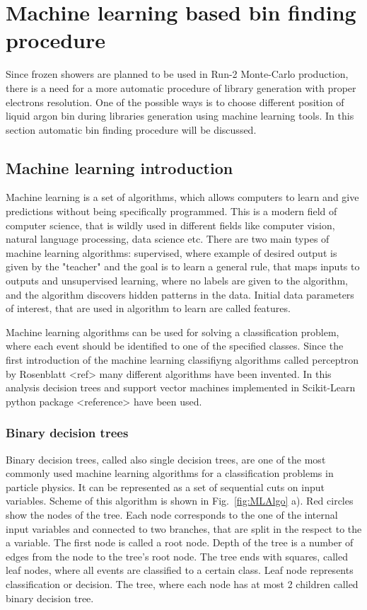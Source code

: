 \section{Machine learning based bin finding procedure}

Since frozen showers are planned to be used in Run-2 Monte-Carlo production, there is a need for a more automatic procedure of library generation with proper electrons resolution. One of the possible ways is to choose different position of liquid argon bin during libraries generation using machine learning tools. In this section automatic bin finding procedure will be discussed.
\subsection{Machine learning introduction} 

Machine learning is a set of algorithms, which allows computers to learn and give predictions without being specifically programmed. This is a modern field of computer science, that is wildly used in different fields like computer vision, natural language processing, data science etc. There are two main types of machine learning algorithms: supervised, where example of desired output is given by the "teacher" and the goal is to learn a general rule, that maps inputs to outputs and unsupervised learning, where no labels are given to the algorithm, and the algorithm discovers hidden patterns in the data. Initial data parameters of interest, that are used in algorithm to learn are called features. 

Machine learning algorithms can be used for solving a classification problem, where each event should be identified to one of the specified classes. Since the first introduction of the machine learning classifiyng algorithms called perceptron by Rosenblatt <ref> many different algorithms have been invented. In this analysis decision trees and support vector machines implemented in Scikit-Learn python package <reference> have been used. 

\subsubsection{Binary decision trees}

Binary decision trees, called also single decision trees, are one of the most commonly used machine learning algorithms for a classification problems in particle physics. It can be represented as a set of sequential cuts on input variables. 
Scheme of this algorithm is shown in Fig.~\ref{fig:MLAlgo} a). Red circles show the nodes of the tree. Each node corresponds to the one of the internal input variables and connected to two branches, that are split in the respect to the a variable. The first node is called a root node. Depth of the tree is a number of edges from the node to the tree's root node. The tree ends with squares, called leaf nodes, where all events are classified to a certain class. Leaf node represents classification or decision. The tree, where each node has at most 2 children called binary decision tree.


